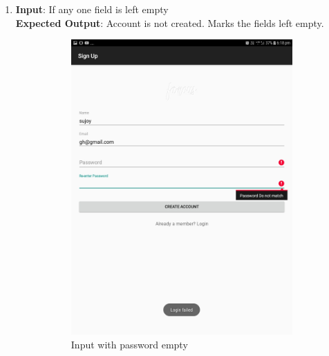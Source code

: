 \documentclass{scrreprt}
\begin{document}
\begin{itemize}
\begin{enumerate}
\item \textbf{Input}: If any one field is left empty\\
\textbf{Expected Output}: Account is not created. Marks the fields left empty.
\begin{figure}[H]
\begin{subfigure}{0.5\textwidth}
\includegraphics[width=0.85\linewidth, keepaspectratio]{signupempty.jpg} 
\caption{Input with password empty}
\label{fig:subim1}
\end{subfigure}
\begin{subfigure}{0.5\textwidth}

\end{subfigure}
\end{figure}
\end{enumerate}
\end{itemize}
\end{document}
